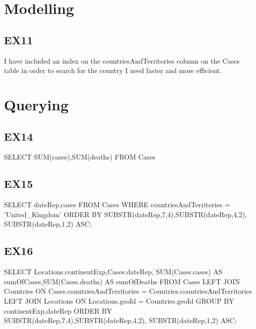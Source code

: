 \documentclass{article}
\begin{document}
\section{Modelling}
\newline
\subsection{EX11}
I have included an index on the countriesAndTerritories column on the Cases table in order to search for the country I need faster and more efficient.
\newline
\section{Querying}
\newline
\subsection{EX14}
SELECT SUM(cases),SUM(deaths)
FROM Cases
\newline
\subsection{EX15}
SELECT dateRep,cases\newline
FROM Cases\newline
WHERE countriesAndTerritories = 'United\_Kingdom'\newline
ORDER BY SUBSTR(dateRep,7,4),SUBSTR(dateRep,4,2),\newline
         SUBSTR(dateRep,1,2) ASC;\newline
\newline
\subsection{EX16}
SELECT Locations.continentExp,Cases.dateRep,\newline
    SUM(Cases.cases) AS sumOfCases,SUM(Cases.deaths) AS sumOfDeaths\newline
FROM Cases\newline
LEFT JOIN Countries\newline
    ON Cases.countriesAndTerritories = Countries.countriesAndTerritories\newline
LEFT JOIN Locations\newline
    ON Locations.geoId = Countries.geoId\newline
GROUP BY continentExp,dateRep\newline
ORDER BY SUBSTR(dateRep,7,4),SUBSTR(dateRep,4,2),\newline
         SUBSTR(dateRep,1,2) ASC;
\newline
\end{document}
